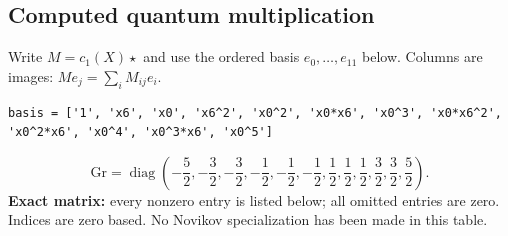 \documentclass[10pt,a4paper]{article}
\begin{document}
\subsection*{Computed quantum multiplication}
Write $M=c_1(X)\star$ and use the ordered basis $e_0,\ldots,e_{11}$ below. Columns are images: $M e_j=\sum_i M_{ij}e_i$.
\begin{lstlisting}
basis = ['1', 'x6', 'x0', 'x6^2', 'x0^2', 'x0*x6', 'x0^3', 'x0*x6^2', 'x0^2*x6', 'x0^4', 'x0^3*x6', 'x0^5']
\end{lstlisting}
\[\mathrm{Gr}=\operatorname{diag}\!\left(- \frac{5}{2},- \frac{3}{2},- \frac{3}{2},- \frac{1}{2},- \frac{1}{2},- \frac{1}{2},\frac{1}{2},\frac{1}{2},\frac{1}{2},\frac{3}{2},\frac{3}{2},\frac{5}{2}\right).\]
\textbf{Exact matrix:} every nonzero entry is listed below; all omitted entries are zero. Indices are zero based. No Novikov specialization has been made in this table.
\end{document}
